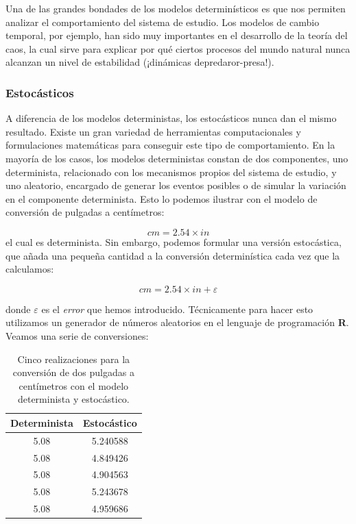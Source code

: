 \documentclass[
]{book}
\begin{document}
Una de las grandes bondades de los modelos determinísticos es que nos permiten analizar el comportamiento del sistema de estudio. Los modelos de cambio temporal, por ejemplo, han sido muy importantes en el desarrollo de la teoría del caos, la cual sirve para explicar por qué ciertos procesos del mundo natural nunca alcanzan un nivel de estabilidad (¡dinámicas depredaror-presa!).

\hypertarget{estocuxe1sticos}{%
\subsubsection{Estocásticos}\label{estocuxe1sticos}}

A diferencia de los modelos deterministas, los estocásticos nunca dan el mismo resultado. Existe un gran variedad de herramientas computacionales y formulaciones matemáticas para conseguir este tipo de comportamiento. En la mayoría de los casos, los modelos deterministas constan de dos componentes, uno determinista, relacionado con los mecanismos propios del sistema de estudio, y uno aleatorio, encargado de generar los eventos posibles o de simular la variación en el componente determinista. Esto lo podemos ilustrar con el modelo de conversión de pulgadas a centímetros:

\[
cm = 2.54 \times in
\]
el cual es determinista. Sin embargo, podemos formular una versión estocástica, que añada una pequeña cantidad a la conversión determinística cada vez que la calculamos:

\[
cm = 2.54 \times in + \varepsilon
\]

donde \(\varepsilon\) es el \emph{error} que hemos introducido. Técnicamente para hacer esto utilizamos un generador de números aleatorios en el lenguaje de programación \textbf{R}. Veamos una serie de conversiones:

\begin{table}

\caption{\label{tab:unnamed-chunk-20}Cinco realizaciones para la conversión de dos pulgadas a centímetros con el modelo determinista y estocástico.}
\centering
\begin{tabular}[t]{c|c}
\hline
Determinista & Estocástico\\
\hline
5.08 & 5.240588\\
\hline
5.08 & 4.849426\\
\hline
5.08 & 4.904563\\
\hline
5.08 & 5.243678\\
\hline
5.08 & 4.959686\\
\hline
\end{tabular}
\end{table}
\end{document}
